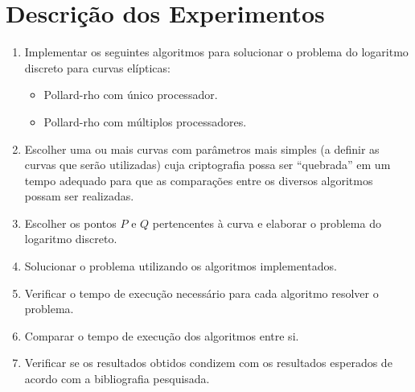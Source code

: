 \chapter{Descrição dos Experimentos}

\begin{enumerate}

\item Implementar os seguintes algoritmos para solucionar o problema do logaritmo discreto para curvas elípticas:
  \begin{itemize}
  \item Pollard-rho com único processador.
  \item Pollard-rho com múltiplos processadores.
  \end{itemize}
\item Escolher uma ou mais curvas com parâmetros mais simples (a definir as curvas que serão utilizadas) cuja criptografia possa ser ``quebrada'' em um tempo adequado para que as comparações entre os diversos algoritmos possam ser realizadas.
\item Escolher os pontos \(P\) e \(Q\) pertencentes à curva e elaborar o problema do logaritmo discreto.
\item Solucionar o problema utilizando os algoritmos implementados.
\item Verificar o tempo de execução necessário para cada algoritmo resolver o problema.
\item Comparar o tempo de execução dos algoritmos entre si.
\item Verificar se os resultados obtidos condizem com os resultados esperados de acordo com a bibliografia pesquisada.

\end{enumerate}
